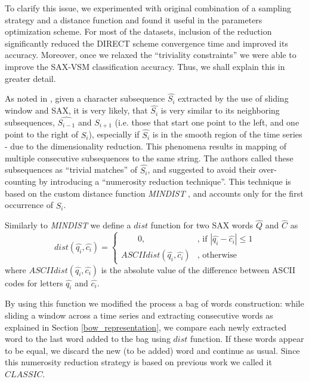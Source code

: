 \documentclass{llncs}
\begin{document}
To clarify this issue, we experimented with original combination of a sampling strategy 
and a distance function and found it useful in the parameters optimization scheme. 
For most of the datasets, inclusion of the reduction significantly reduced the DIRECT 
scheme convergence time and improved its accuracy. 
Moreover, once we relaxed the ``triviality constraints'' we were able to improve the 
SAX-VSM classification accuracy. Thus, we shall explain this in greater detail.

As noted in \cite{sax}, given a character subsequence $\hat{S_{i}}$ extracted by the use 
of sliding window and SAX, it is very likely, that $\hat{S_{i}}$ is very similar to its
neighboring subsequences, $\hat{S_{i-1}}$ and $\hat{S_{i+1}}$ (i.e. those that start one 
point to the left, and one point to the right of $\hat{S_{i}}$), especially if $\hat{S_{i}}$
is in the smooth region of the time series - due to the dimensionality reduction. 
This phenomena results in mapping of multiple consecutive subsequences
to the same string. The authors called these subsequences as ``trivial matches'' of 
$\hat{S_{i}}$, and suggested to avoid their over-counting by introducing a 
``numerosity reduction technique''. This technique is based on the custom distance 
function \textit{MINDIST} \cite{streaming_sax}, and accounts only for the first 
occurrence of $\hat{S_{i}}$. 

Similarly to \textit{MINDIST} we define a $dist$ function for two
SAX words $\hat{Q}$ and $\hat{C}$ as
\begin{equation}
 dist(\hat{q_{i}},\hat{c_{i}})=
        \begin{cases} \qquad  0, & \mbox{, if } | \hat{q_{i}} - \hat{c_{i}} | \leq 1 \\
         ASCIIdist( \hat{q_{i}} , \hat{c_{i}} ) & \mbox{, otherwise } 
        \end{cases}
\end{equation} 
where $ASCIIdist( \hat{q_{i}}, \hat{c_{i}} )$ is the absolute value of the difference between 
ASCII codes for letters $\hat{q_{i}}$ and $\hat{c_{i}}$.

By using this function we modified the process a bag of words construction: 
while sliding a window across a time series and extracting consecutive words
as explained in Section \ref{bow_representation}, we compare each newly 
extracted word to the last word added to the bag using $dist$ function. 
If these words appear to be equal, we discard the new (to be added) word and 
continue as usual. Since this numerosity reduction strategy is based 
on previous work we called it $CLASSIC$.
\end{document}
